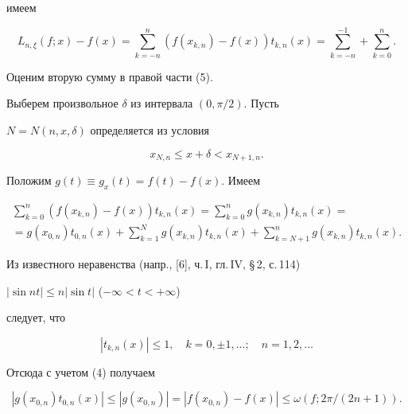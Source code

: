 имеем


\begin{equation}


L_{n,\xi}(f;x)-f(x)=\sum_{k=-n}^n\left(f(x_{k,n})-f(x)\right)


t_{k,n}(x)=\sum_{k=-n}^{-1}+\sum_{k=0}^n.


\end{equation}





Оценим вторую сумму в правой части (5).


Выберем произвольное $\delta$ из интервала $(0,\pi/2)$. Пусть


$N=N(n,x,\delta)$ определяется из условия


\begin{equation}


x_{N,n}\le x+\delta<x_{N+1,n}.


\end{equation}


Положим $g(t)\equiv g_x(t)=f(t)-f(x)$. Имеем


\begin{multline}


\sum_{k=0}^n(f(x_{k,n})-f(x))t_{k,n}(x)=


\sum_{k=0}^ng(x_{k,n})t_{k,n}(x)=\\


%


=g(x_{0,n})t_{0,n}(x)+\sum_{k=1}^Ng(x_{k,n})t_{k,n}(x)+


\sum_{k=N+1}^ng(x_{k,n})t_{k,n}(x). 


\end{multline}


Из известного неравенства (напр., [6], ч.\,I, гл.\,IV, \S\,2, с.\,114)


$|\sin nt|\le n|\sin t|$ ($-\infty<t<+\infty$)


следует, что


\begin{equation}


|t_{k,n}(x)|\le 1,\quad k=0,\pm 1,\dotsc;\quad n=1,2,\dotsc


\end{equation}


Отсюда с учетом (4) получаем 


\begin{equation}


|g(x_{0,n})t_{0,n}(x)|\le|g(x_{0,n})|=|f(x_{0,n})-f(x)|


\le\omega(f;2\pi/(2n+1)).


\end{equation}





